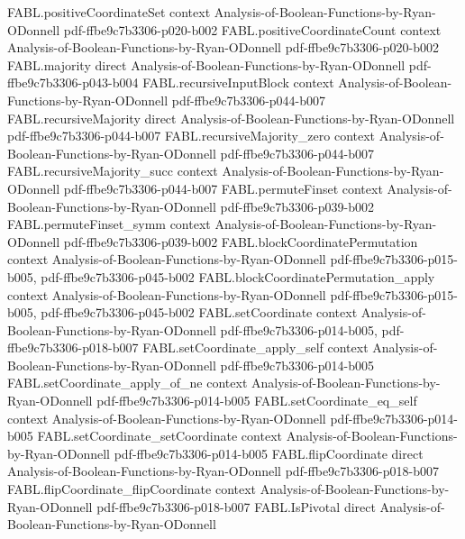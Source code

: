 \begin{theorem}
\proofstep
  {FABL.positiveCoordinateSet}
  {context}
  {Analysis-of-Boolean-Functions-by-Ryan-ODonnell}
  {pdf-ffbe9c7b3306-p020-b002}
\proofstep
  {FABL.positiveCoordinateCount}
  {context}
  {Analysis-of-Boolean-Functions-by-Ryan-ODonnell}
  {pdf-ffbe9c7b3306-p020-b002}
\proofstep
  {FABL.majority}
  {direct}
  {Analysis-of-Boolean-Functions-by-Ryan-ODonnell}
  {pdf-ffbe9c7b3306-p043-b004}
\proofstep
  {FABL.recursiveInputBlock}
  {context}
  {Analysis-of-Boolean-Functions-by-Ryan-ODonnell}
  {pdf-ffbe9c7b3306-p044-b007}
\proofstep
  {FABL.recursiveMajority}
  {direct}
  {Analysis-of-Boolean-Functions-by-Ryan-ODonnell}
  {pdf-ffbe9c7b3306-p044-b007}
\proofstep
  {FABL.recursiveMajority_zero}
  {context}
  {Analysis-of-Boolean-Functions-by-Ryan-ODonnell}
  {pdf-ffbe9c7b3306-p044-b007}
\proofstep
  {FABL.recursiveMajority_succ}
  {context}
  {Analysis-of-Boolean-Functions-by-Ryan-ODonnell}
  {pdf-ffbe9c7b3306-p044-b007}
\proofstep
  {FABL.permuteFinset}
  {context}
  {Analysis-of-Boolean-Functions-by-Ryan-ODonnell}
  {pdf-ffbe9c7b3306-p039-b002}
\proofstep
  {FABL.permuteFinset_symm}
  {context}
  {Analysis-of-Boolean-Functions-by-Ryan-ODonnell}
  {pdf-ffbe9c7b3306-p039-b002}
\proofstep
  {FABL.blockCoordinatePermutation}
  {context}
  {Analysis-of-Boolean-Functions-by-Ryan-ODonnell}
  {pdf-ffbe9c7b3306-p015-b005,
    pdf-ffbe9c7b3306-p045-b002}
\proofstep
  {FABL.blockCoordinatePermutation_apply}
  {context}
  {Analysis-of-Boolean-Functions-by-Ryan-ODonnell}
  {pdf-ffbe9c7b3306-p015-b005,
    pdf-ffbe9c7b3306-p045-b002}
\proofstep
  {FABL.setCoordinate}
  {context}
  {Analysis-of-Boolean-Functions-by-Ryan-ODonnell}
  {pdf-ffbe9c7b3306-p014-b005,
    pdf-ffbe9c7b3306-p018-b007}
\proofstep
  {FABL.setCoordinate_apply_self}
  {context}
  {Analysis-of-Boolean-Functions-by-Ryan-ODonnell}
  {pdf-ffbe9c7b3306-p014-b005}
\proofstep
  {FABL.setCoordinate_apply_of_ne}
  {context}
  {Analysis-of-Boolean-Functions-by-Ryan-ODonnell}
  {pdf-ffbe9c7b3306-p014-b005}
\proofstep
  {FABL.setCoordinate_eq_self}
  {context}
  {Analysis-of-Boolean-Functions-by-Ryan-ODonnell}
  {pdf-ffbe9c7b3306-p014-b005}
\proofstep
  {FABL.setCoordinate_setCoordinate}
  {context}
  {Analysis-of-Boolean-Functions-by-Ryan-ODonnell}
  {pdf-ffbe9c7b3306-p014-b005}
\proofstep
  {FABL.flipCoordinate}
  {direct}
  {Analysis-of-Boolean-Functions-by-Ryan-ODonnell}
  {pdf-ffbe9c7b3306-p018-b007}
\proofstep
  {FABL.flipCoordinate_flipCoordinate}
  {context}
  {Analysis-of-Boolean-Functions-by-Ryan-ODonnell}
  {pdf-ffbe9c7b3306-p018-b007}
\proofstep
  {FABL.IsPivotal}
  {direct}
  {Analysis-of-Boolean-Functions-by-Ryan-ODonnell}

\end{theorem}
